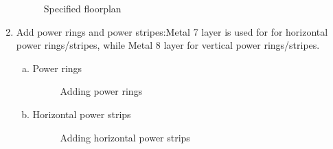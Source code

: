 \documentclass[a4paper,11pt]{article}%
\begin{document}
\begin{enumerate}[1.)]
	\begin{figure}[h]
	\centering
	\caption{Specified floorplan}
	\label{fig:innovus_2}
	\end{figure}
		
	\item Add power rings and power stripes:Metal 7 layer is used  for for horizontal power rings/stripes, while Metal 8  layer for vertical power rings/stripes.
	
	\begin{enumerate}[a.]
		\item  Power rings
		\begin{figure}[H]
			\centering
			\caption{Adding power rings}
			\label{fig:innovus_3_2}
		\end{figure}
		\pagebreak
		\item Horizontal power strips
		\begin{figure}[H]
			\centering
			\caption{Adding horizontal power strips}
			\label{fig:innovus_4_2}
		\end{figure}
		

\end{enumerate}
\end{enumerate}
\end{document}
